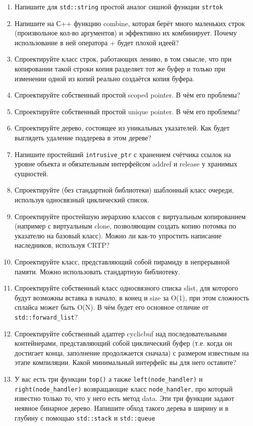 \documentclass[a4paper,12pt,oneside]{article}
\begin{document}
\begin{enumerate}
\item 
Напишите для \lstinline!std::string! простой аналог сишной функции \lstinline!strtok!
\item 
Напишите на С++ функцию combine, которая берёт много маленьких строк (произвольное кол-во аргументов) и эффективно их комбинирует. Почему использование в ней оператора + будет плохой идеей?
\item 
Спроектируйте класс строк, работающих лениво, в том смысле, что при копировании такой строки копия разделяет тот же буфер и только при изменении одной из копий реально создаётся копия буфера.
\item 
Спроектируйте собственный простой scoped pointer. В чём его проблемы?
\item 
Спроектируйте собственный простой unique pointer. В чём его проблемы?
\item 
Спроектируйте дерево, состоящее из уникальных указателей. Как будет выглядеть удаление поддерева в этом дереве?
\item 
Напишите простейший \lstinline!intrusive_ptr! с хранением счётчика ссылок на уровне объекта и обязательным интерфейсом addref и release у хранимых сущностей.
\item 
Спроектируйте (без стандартной библиотеки) шаблонный класс очереди, используя односвязный циклический список.
\item 
Спроектируйте простейшую иерархию классов с виртуальным копированием (например с виртуальным clone, позволяющим создать копию потомка по указателю на базовый класс). Можно ли как-то упростить написание наследников, используя CRTP?
\item 
Спроектируйте класс, представляющий собой пирамиду в непрерывной памяти. Можно использовать стандартную библиотеку.
\item 
Спроектируйте собственный класс односвязного списка slist, для которого будут возможны вставка в начало, в конец и size за O(1), при этом сложность сплайса может быть O(N). В чём будет его основное отличие от \lstinline!std::forward_list!?
\item 
Спроектируйте собственный адаптер cyclicbuf над последовательными контейнерами, представляющий собой циклический буфер (т.е. когда он достигает конца, заполнение продолжается сначала) с размером известным на этапе компиляции. Какой минимальный интерфейс вы для него оставите?
\item 
У вас есть три функции \lstinline!top()! а также \lstinline!left(node_handler)! и \lstinline!right(node_handler)! возвращающие класс \lstinline!node_handler!, про который известно только то, что у него есть метод data. Эти три функции задают неявное бинарное дерево. Напишите обход такого дерева в ширину и в глубину с помощью \lstinline!std::stack! и \lstinline!std::queue!

\end{enumerate}
\end{document}
